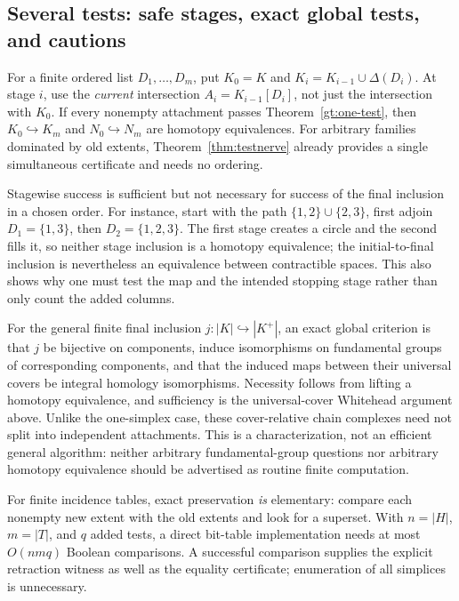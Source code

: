 \documentclass[11pt]{article}
\theoremstyle{definition}
\begin{document}
\subsection{Several tests: safe stages, exact global tests, and cautions}

For a finite ordered list $D_1,\ldots,D_m$, put
$K_0=K$ and $K_i=K_{i-1}\cup\Delta(D_i)$. At stage $i$, use the
\emph{current} intersection $A_i=K_{i-1}[D_i]$, not just the
intersection with $K_0$. If every nonempty attachment passes
Theorem~\ref{gt:one-test}, then $K_0\hookrightarrow K_m$ and
$N_0\hookrightarrow N_m$ are homotopy equivalences. For arbitrary
families dominated by old extents, Theorem~\ref{thm:testnerve} already
provides a single simultaneous certificate and needs no ordering.

Stagewise success is sufficient but not necessary for success of the
final inclusion in a chosen order. For instance, start with the path
$\{1,2\}\cup\{2,3\}$, first adjoin $D_1=\{1,3\}$, then
$D_2=\{1,2,3\}$. The first stage creates a circle and the second
fills it, so neither stage inclusion is a homotopy equivalence; the
initial-to-final inclusion is nevertheless an equivalence between
contractible spaces. This also shows why one must test the map and
the intended stopping stage rather than only count the added columns.

For the general finite final inclusion $j:|K|\hookrightarrow|K^+|$,
an exact global criterion is that $j$ be bijective on components, induce
isomorphisms on fundamental groups of corresponding components, and
that the induced maps between their universal covers be integral
homology isomorphisms. Necessity follows from lifting a homotopy
equivalence, and sufficiency is the universal-cover Whitehead argument
above. Unlike the one-simplex case, these cover-relative chain complexes
need not split into independent attachments. This is a characterization,
not an efficient general algorithm: neither arbitrary fundamental-group
questions nor arbitrary homotopy equivalence should be advertised as
routine finite computation.

For finite incidence tables, exact preservation \emph{is} elementary:
compare each nonempty new extent with the old extents and look for a
superset. With $n=|H|$, $m=|T|$, and $q$ added tests, a direct bit-table
implementation needs at most $O(nmq)$ Boolean comparisons. A successful
comparison supplies the explicit retraction witness as well as the
equality certificate; enumeration of all simplices is unnecessary.
\end{document}
